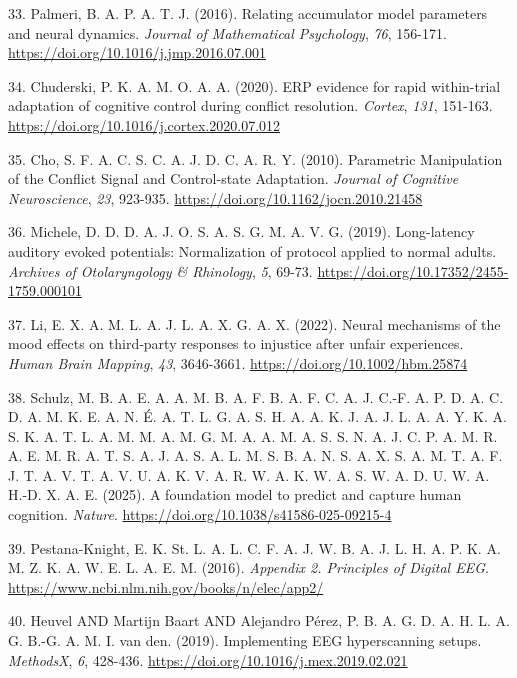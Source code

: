 \documentclass[
  spanish,
  10pt,
]{article}
\newlength{\cslhangindent}
\newenvironment{CSLReferences}[2] %
 {\begin{list}{}{%
  \setlength{\itemindent}{0pt}
  \setlength{\leftmargin}{0pt}
  \setlength{\parsep}{0pt}
  \ifodd #1
   \setlength{\leftmargin}{\cslhangindent}
   \setlength{\itemindent}{-1\cslhangindent}
  \fi
  \setlength{\itemsep}{#2\baselineskip}}}
 {\end{list}}
\begin{document}
\begin{CSLReferences}{1}{0}
33. Palmeri, B. A. P. A. T. J. (2016). Relating accumulator model
parameters and neural dynamics. \emph{Journal of Mathematical
Psychology}, \emph{76}, 156-171.
\url{https://doi.org/10.1016/j.jmp.2016.07.001}

34. Chuderski, P. K. A. M. O. A. A. (2020). ERP evidence for rapid
within-trial adaptation of cognitive control during conflict resolution.
\emph{Cortex}, \emph{131}, 151-163.
\url{https://doi.org/10.1016/j.cortex.2020.07.012}

35. Cho, S. F. A. C. S. C. A. J. D. C. A. R. Y. (2010). Parametric
Manipulation of the Conflict Signal and Control-state Adaptation.
\emph{Journal of Cognitive Neuroscience}, \emph{23}, 923-935.
\url{https://doi.org/10.1162/jocn.2010.21458}

36. Michele, D. D. D. A. J. O. S. A. S. G. M. A. V. G. (2019).
Long-latency auditory evoked potentials: Normalization of protocol
applied to normal adults. \emph{Archives of Otolaryngology \&
Rhinology}, \emph{5}, 69-73.
\url{https://doi.org/10.17352/2455-1759.000101}

37. Li, E. X. A. M. L. A. J. L. A. X. G. A. X. (2022). Neural mechanisms
of the mood effects on third‐party responses to injustice after unfair
experiences. \emph{Human Brain Mapping}, \emph{43}, 3646-3661.
\url{https://doi.org/10.1002/hbm.25874}

38. Schulz, M. B. A. E. A. A. M. B. A. F. B. A. F. C. A. J. C.-F. A. P.
D. A. C. D. A. M. K. E. A. N. É. A. T. L. G. A. S. H. A. A. K. J. A. J.
L. A. A. Y. K. A. S. K. A. T. L. A. M. M. A. M. G. M. A. A. M. A. S. S.
N. A. J. C. P. A. M. R. A. E. M. R. A. T. S. A. J. A. S. A. L. M. S. B.
A. N. S. A. X. S. A. M. T. A. F. J. T. A. V. T. A. V. U. A. K. V. A. R.
W. A. K. W. A. S. W. A. D. U. W. A. H.-D. X. A. E. (2025). A foundation
model to predict and capture human cognition. \emph{Nature}.
\url{https://doi.org/10.1038/s41586-025-09215-4}

39. Pestana-Knight, E. K. St. L. A. L. C. F. A. J. W. B. A. J. L. H. A.
P. K. A. M. Z. K. A. W. E. L. A. E. M. (2016). \emph{Appendix 2.
Principles of Digital EEG}.
\url{https://www.ncbi.nlm.nih.gov/books/n/elec/app2/}

40. Heuvel AND Martijn Baart AND Alejandro Pérez, P. B. A. G. D. A. H.
L. A. G. B.-G. A. M. I. van den. (2019). Implementing EEG hyperscanning
setups. \emph{MethodsX}, \emph{6}, 428-436.
\url{https://doi.org/10.1016/j.mex.2019.02.021}

\end{CSLReferences}
\end{document}
